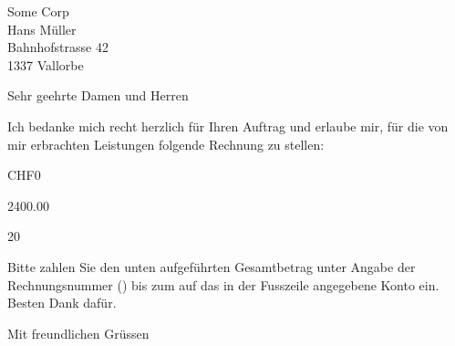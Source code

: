 \documentclass[DIN,SN,10pt,DIV=18,_rechnung]{scrlttr2}
\begin{document}
  \begin{letter}{
      Some Corp \\
      Hans Müller \\
      Bahnhofstrasse 42 \\
      1337 Vallorbe
    }

    \opening{Sehr geehrte Damen und Herren}
    \thispagestyle{plain}

    Ich bedanke mich recht herzlich für Ihren Auftrag und erlaube mir, für die
    von mir erbrachten Leistungen folgende Rechnung zu stellen:

    \begin{invoice}{CHF}{0}

       {2400.00}
      \STExpenses

       {20}
    \end{invoice}

    \begin{samepage}
      Bitte zahlen Sie den unten aufgeführten Gesamtbetrag unter Angabe der
      Rechnungsnummer () bis zum  auf
      das in der Fusszeile angegebene Konto ein.\\
      Besten Dank dafür.

      \closing{Mit freundlichen Grüssen}

    \end{samepage}
 \end{letter}
\end{document}
